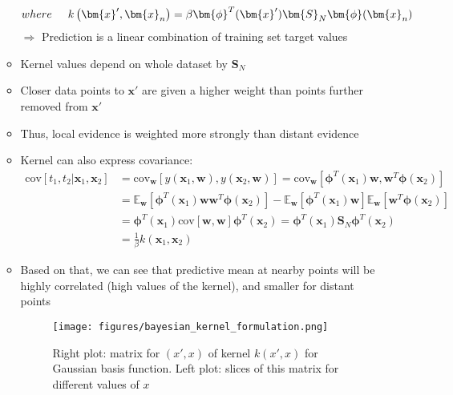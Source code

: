 \begin{itemize}
\begin{itemize}
\begin{equation*}
\begin{split}
{				where\hspace{5mm}} k\left(\bm{x}',\bm{x}_n\right)=\beta \bm{\phi}^T(\bm{x}')\bm{S}_N \bm{\phi}(\bm{x}_n)
		\end{split}
		\end{equation*}
		$\Rightarrow$ Prediction is a linear combination of training set target values
		\item Kernel values depend on whole dataset by $\bm{S}_N$
		\item Closer data points to $\bm{x}'$ are given a higher weight than points further removed from $\bm{x}'$
		\item Thus, local evidence is weighted more strongly than distant evidence
		\item Kernel can also express covariance:
		\begin{equation*}
		\begin{split}
		\text{cov}\left[t_1, t_2 | \bm{x}_1, \bm{x}_2\right] & = \text{cov}_{\bm{w}}\left[y(\bm{x}_1, \bm{w}), y(\bm{x}_2, \bm{w})\right] = \text{cov}_{\bm{w}}\left[\bm{\phi}^T(\bm{x}_1)\bm{w}, \bm{w}^T\bm{\phi}(\bm{x}_2)\right]\\
		& = \mathbb{E}_{\bm{w}}\left[\bm{\phi}^T(\bm{x}_1)\bm{w} \bm{w}^T\bm{\phi}(\bm{x}_2)\right] - \mathbb{E}_{\bm{w}}\left[\bm{\phi}^T(\bm{x}_1)\bm{w}\right]\mathbb{E}_{\bm{w}}\left[\bm{w}^T\bm{\phi}(\bm{x}_2)\right]\\
		& = \bm{\phi}^T(\bm{x}_1)\text{cov}\left[\bm{w},\bm{w}\right] \bm{\phi}^T(\bm{x}_2) = \bm{\phi}^T(\bm{x}_1)\bm{S}_N \bm{\phi}^T(\bm{x}_2)\\
		& = \frac{1}{\beta}k\left(\bm{x}_1,\bm{x}_2\right) 
		\end{split}
		\end{equation*}
		\item Based on that, we can see that predictive mean at nearby points will be highly correlated (high values of the kernel), and smaller for distant points
			\begin{figure}[ht]
			\centering
			\texttt{[image: figures/bayesian\_kernel\_formulation.png]}
			\caption{Right plot: matrix for $(x',x)$ of kernel $k\left(x',x\right)$ for Gaussian basis function. Left plot: slices of this matrix for different values of $x$}
		\end{figure}
		
	\end{itemize}
\end{itemize}
